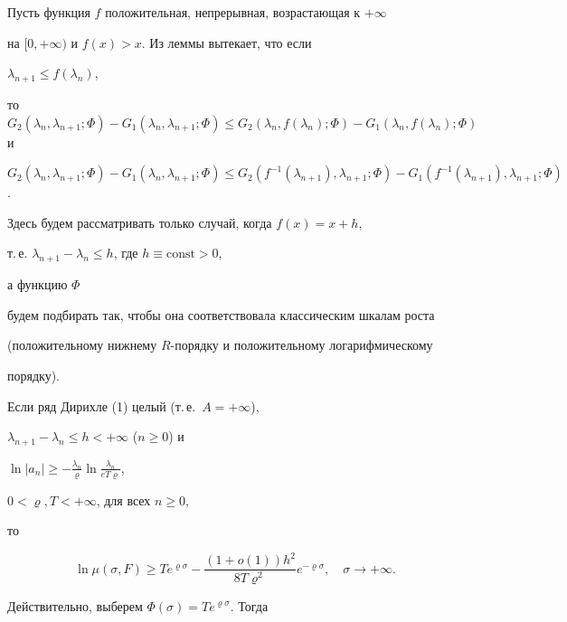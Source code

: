 Пусть функция $f$ положительная, непрерывная, возрастающая к $+\infty$ 


на $[0,+\infty)$ и $f(x)>x$. Из леммы вытекает, что если


$\lambda_{n+1}\le f(\lambda_n)$,


то $G_2(\lambda_n,\lambda_{n+1};\Phi)-G_1(\lambda_n,\lambda_{n+1};\Phi)\le


G_2(\lambda_n,f(\lambda_n);\Phi)-G_1(\lambda_n,f(\lambda_n);\Phi)$ и 


$G_2(\lambda_n,\lambda_{n+1};\Phi)-G_1(\lambda_n,\lambda_{n+1};\Phi)\le


G_2(f^{-1}(\lambda_{n+1}),\lambda_{n+1};\Phi)-


G_1(f^{-1}(\lambda_{n+1}),\lambda_{n+1};\Phi)$.


Здесь будем рассматривать только случай, когда $f(x)=x+h$,


т.\,е. $\lambda_{n+1}-\lambda_n\le h$, где $h\equiv\text{const}>0$,


а функцию $\Phi$ 


будем подбирать так, чтобы она соответствовала классическим шкалам роста


(положительному нижнему $R$-порядку и положительному логарифмическому


порядку).





\begin{cor} Если ряд Дирихле (1) целый (т.\,е.~$A=+\infty$),


$\lambda_{n+1}-\lambda_n\le h<+\infty$ ($n\ge 0$) и


$\ln |a_n|\ge -\frac{\lambda_n}{\varrho}\ln\frac{\lambda_n}{eT\varrho}$,


$0<\varrho, T<+\infty$, для всех $n\ge 0$,


то 


\begin{equation}


\ln\mu(\sigma,F)\ge Te^{\varrho\sigma}-


\frac{(1+o(1))h^2}{8T\varrho^2}e^{-\varrho\sigma},


\quad \sigma\to+\infty.


\end{equation}


\end{cor}





Действительно, выберем $\Phi(\sigma)=Te^{\varrho\sigma}$. Тогда 


